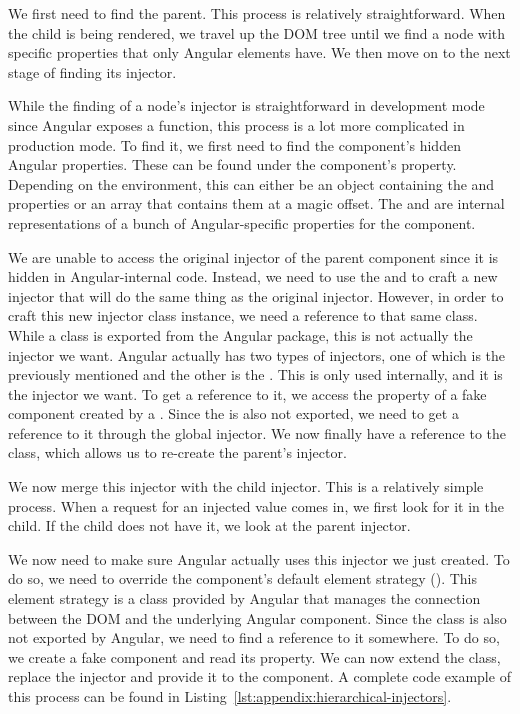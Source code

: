 {  We first need to find the parent. This process is relatively straightforward. When the child is being rendered, we travel up the DOM tree until we find a node with specific properties that only Angular elements have. We then move on to the next stage of finding its injector.

  While the finding of a node's injector is straightforward in development mode since Angular exposes a  function, this process is a lot more complicated in production mode. To find it, we first need to find the component's hidden Angular properties. These can be found under the component's  property. Depending on the environment, this can either be an object containing the  and  properties or an array that contains them at a magic offset. The  and  are internal representations of a bunch of Angular-specific properties for the component.

  We are unable to access the original injector of the parent component since it is hidden in Angular-internal code. Instead, we need to use the  and  to craft a new injector that will do the same thing as the original injector. However, in order to craft this new injector class instance, we need a reference to that same class. While a  class is exported from the Angular package, this is not actually the injector we want. Angular actually has two types of injectors, one of which is the previously mentioned  and the other is the . This  is only used internally, and it is the injector we want. To get a reference to it, we access the  property of a fake component created by a . Since the  is also not exported, we need to get a reference to it through the global injector. We now finally have a reference to the  class, which allows us to re-create the parent's injector.

  We now merge this injector with the child injector. This is a relatively simple process. When a request for an injected value comes in, we first look for it in the child. If the child does not have it, we look at the parent injector.

  We now need to make sure Angular actually uses this injector we just created. To do so, we need to override the component's default element strategy (). This element strategy is a class provided by Angular that manages the connection between the DOM and the underlying Angular component. Since the  class is also not exported by Angular, we need to find a reference to it somewhere. To do so, we create a fake component and read its  property. We can now extend the class, replace the injector and provide it to the component. A complete code example of this process can be found in Listing~\ref{lst:appendix:hierarchical-injectors}.

}
